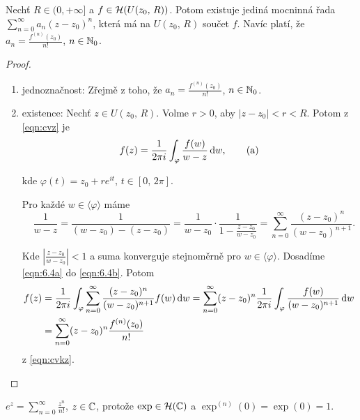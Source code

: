 \begin{theorem}
Nechť $R \in (0, +\infty]$ a $f \in \operatorname{\mathcal{H}} (U(z_0,\,R))$. Potom existuje jediná mocninná řada $\sum\limits _{n=0} ^{\infty} a_n(z-z_0)^n$, která má na $U(z_0,\,R)$ součet $f$. Navíc platí, že $a_n=\frac{f^{(n)}(z_0)}{n!}$, $n \in \operatorname{\mathbb{N}}_0$.
\end{theorem}

\begin{proof}
\begin{enumerate}
    \item jednoznačnost: Zřejmě z toho, že $a_n=\frac{f^{(n)}(z_0)}{n!}$, $n \in \operatorname{\mathbb{N}}_0$.
    \item existence: Nechť $z \in U(z_0,\,R)$. Volme $r>0$, aby $|z-z_0|<r<R$. Potom z \cref{eqn:cvz} je
    \begin{equation}
        f(z)=\frac{1}{2 \pi i} \int_\varphi \frac{f(w)}{w-z} \mathop{}\!\mathrm{d} w,
        \tag{a}
        \label{eqn:6.4a}
    \end{equation}
    
    kde $\varphi(t)=z_0+re^{it} \text{, } t \in [0,\,2\pi]$.
    
    Pro každé $w \in \langle \varphi \rangle$ máme
    \begin{equation}
        \quad \frac{1}{w-z}=\frac{1}{(w-z_0)-(z-z_0)}=\frac{1}{w-z_0}\cdot\frac{1}{1-\frac{z-z_0}{w-z_0}}=\sum_{n=0}^\infty \frac{(z-z_0)^n}{(w-z_0)^{n+1}} \text{.}    
        \label{eqn:6.4b}
        \tag{b}
    \end{equation}
    
    Kde $|\frac{z-z_0}{w-z_0}|<1$ a suma konverguje stejnoměrně pro $w \in  \langle \varphi \rangle$. Dosadíme \cref{eqn:6.4a} do \cref{eqn:6.4b}. Potom
    \begin{equation*}
        \begin{split}
    f(z) &=\frac{1}{2 \pi i} \int_\varphi \sum_{n=0}^\infty \frac{(z-z_0)^n}{(w-z_0)^{n+1}} f(w) \mathop{}\!\mathrm{d} w= 
    \sum_{n=0}^\infty (z-z_0)^n \frac{1}{2 \pi i} \int_\varphi \frac{f(w)}{(w-z_0)^{n+1}} \mathop{}\!\mathrm{d} w \\
     &=\sum_{n=0}^\infty (z-z_0)^n \frac{f^{(n)}(z_0)}{n!}
     \end{split}
    \end{equation*}
    z \cref{eqn:cvkz}.
\end{enumerate}
\end{proof}

\begin{example}
$e^z=\sum\limits_{n=0}^\infty \frac{z^n}{n!}$, $z \in \operatorname{\mathbb{C}}  $, protože $\exp \in \operatorname{\mathcal{H}} (\operatorname{\mathbb{C}}  )$ a $\exp^{(n)}(0)=\exp(0)=1$.
\end{example}


